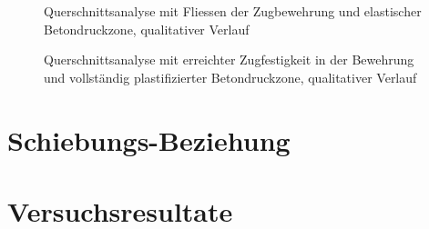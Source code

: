 \documentclass[
  11pt,
  letterpaper,
]{scrreprt}
\begin{document}
\begin{figure}[H]


\caption{\label{fig-qs_fliessen_qualitativ}Querschnittsanalyse mit
Fliessen der Zugbewehrung und elastischer Betondruckzone, qualitativer
Verlauf}

\end{figure}%

\begin{figure}[H]


\caption{\label{fig-qs_widerstand_qualitativ}Querschnittsanalyse mit
erreichter Zugfestigkeit in der Bewehrung und vollständig
plastifizierter Betondruckzone, qualitativer Verlauf}

\end{figure}%

\section{Schiebungs-Beziehung}\label{schiebungs-beziehung}

\section{Versuchsresultate}\label{versuchsresultate}
\end{document}
